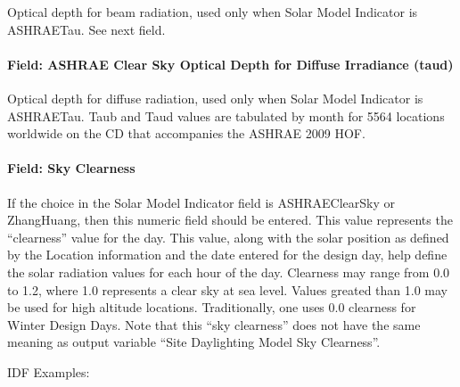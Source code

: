 Optical depth for beam radiation, used only when Solar Model Indicator is ASHRAETau. See next field.

\paragraph{Field: ASHRAE Clear Sky Optical Depth for Diffuse Irradiance (taud)}\label{field-ashrae-clear-sky-optical-depth-for-diffuse-irradiance-taud}

Optical depth for diffuse radiation, used only when Solar Model Indicator is ASHRAETau. Taub and Taud values are tabulated by month for 5564 locations worldwide on the CD that accompanies the ASHRAE 2009 HOF.

\paragraph{Field: Sky Clearness}\label{field-sky-clearness}

If the choice in the Solar Model Indicator field is ASHRAEClearSky or ZhangHuang, then this numeric field should be entered. This value represents the ``clearness'' value for the day. This value, along with the solar position as defined by the Location information and the date entered for the design day, help define the solar radiation values for each hour of the day. Clearness may range from 0.0 to 1.2, where 1.0 represents a clear sky at sea level. Values greated than 1.0 may be used for high altitude locations. Traditionally, one uses 0.0 clearness for Winter Design Days. Note that this ``sky clearness'' does not have the same meaning as output variable ``Site Daylighting Model Sky Clearness''.

IDF Examples:

